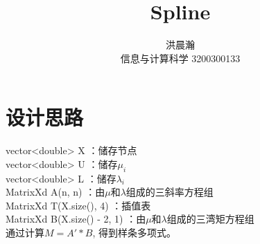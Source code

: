 \documentclass{ctexart}
\title{Spline}
\author{洪晨瀚 \\ 信息与计算科学 3200300133}
\begin{document}
\maketitle

\section*{设计思路}
\begin{flushleft}
  vector<double> X ：储存节点 \\
  vector<double> U ：储存$\mu_i$ \\
  vector<double> L ：储存$\lambda_i$ \\
  MatrixXd A(n, n) ：由$\mu$和$\lambda$组成的三斜率方程组 \\
  MatrixXd T(X.size(), 4) ：插值表 \\
  MatrixXd B(X.size() - 2, 1) ：由$\mu$和$\lambda$组成的三湾矩方程组 \\
  通过计算$M=A'*B$, 得到样条多项式。
\end{flushleft}
\end{document}
